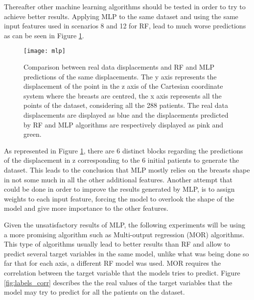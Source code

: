 Thereafter other machine learning algorithms should be tested in order to try to achieve better results. Applying MLP to the same dataset and using the same input features used in scenarios 8 and 12 for RF, lead to much worse predictions as can be seen in Figure \ref{fig:mlp_res}.

\begin{figure}[!htb]
\centering
\texttt{[image: mlp]}
\caption[Comparison between real data displacements and RF and MLP predictions of the same displacements]{Comparison between real data displacements and RF and MLP predictions of the same displacements. The y axis represents the displacement of the point in the z axis of the Cartesian coordinate system where the breasts are centred, the x axis represents all the points of the dataset, considering all the 288 patients. The real data displacements are displayed as blue and the displacements predicted by RF and MLP algorithms are respectively displayed as pink and green.}
\label{fig:mlp_res}
\end{figure}

As represented in Figure \ref{fig:mlp_res}, there are 6 distinct blocks regarding the predictions of the displacement in z corresponding to the 6 initial patients to generate the dataset. This leads to the conclusion that MLP mostly relies on the breasts shape in not some much in all the other additional features. Another attempt that could be done in order to improve the results generated by MLP, is to assign weights to each input feature, forcing the model to overlook the shape of the model and give more importance to the other features.

Given the unsatisfactory results of MLP, the following experiments will be using a more promising algorithm such as Multi-output regression (MOR) algorithms. This type of algorithms usually lead to better results than RF and allow to predict several target variables in the same model, unlike what was being done so far that for each axis, a different RF model was used. MOR requires the correlation between the target variable that the models tries to predict. Figure \ref{fig:labels_corr} describes the the real values of the target variables that the model may try to predict for all the patients on the dataset.


